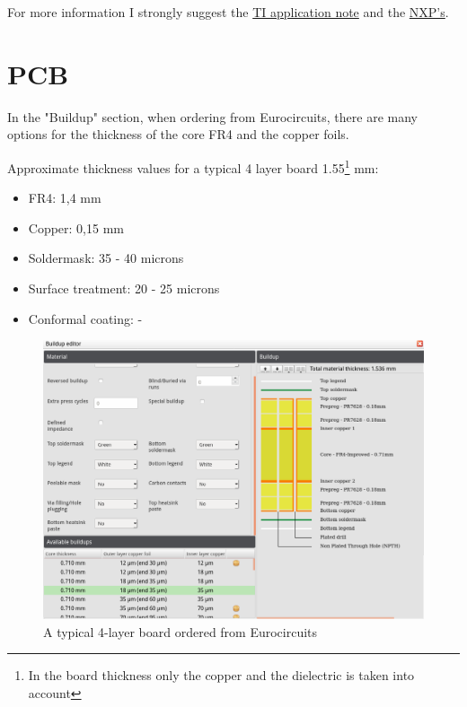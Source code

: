 \documentclass[final]{cubedoc}
\begin{document}
	
	For more information I strongly suggest the \href{https://web.archive.org/web/20200818132243/https://www.ti.com/lit/an/spra953c/spra953c.pdf}{TI application note} and the \href{https://web.archive.org/web/20200818123847/https://www.nxp.com/docs/en/white-paper/BasicThermalWP.pdf}{NXP's}.
	
	\pagebreak
	\section{PCB}
	
	In the "Buildup" section, when ordering from Eurocircuits, there are many options for the thickness of the core FR4 and the copper foils.
	
	Approximate thickness values for a typical 4 layer board 1.55\footnote{In the board thickness only the copper and the dielectric is taken into account} mm:
	\begin{itemize}
		\item FR4:  1,4 mm
		\item Copper:  0,15 mm
		\item Soldermask: 35 - 40 microns
		\item Surface treatment: 20 - 25 microns
		\item Conformal coating: -
	\end{itemize}
	
	
	\begin{figure}[h!]
		\centering
		\includegraphics[keepaspectratio, height=0.4\textheight, width=\textwidth]{docs/stackup.png}
		\caption{A typical 4-layer board ordered from Eurocircuits}
		\label{fig:my_label}
	\end{figure}{}
	
\end{document}
